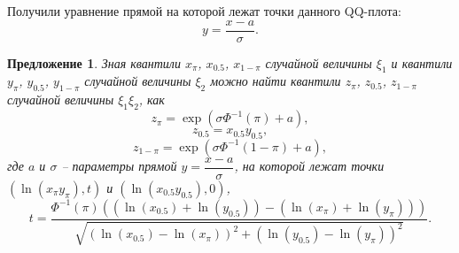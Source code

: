 \documentclass[12pt]{article}
\newtheorem{proposition}[theorem]{Предложение}
\begin{document}
	Получили уравнение прямой на которой лежат точки данного QQ-плота:
	\begin{equation}
		y = \dfrac{x-a}{\sigma}.\label{19}
	\end{equation}
	
	\begin{proposition}
		Зная квантили $x_{\pi}$, $x_{0.5}$, $x_{1-\pi}$ случайной величины $\xi_{1}$ и квантили $y_{\pi}$, $y_{0.5}$, $y_{1-\pi}$ случайной величины $\xi_{2}$ можно найти квантили $z_{\pi}$, $z_{0.5}$, $z_{1-\pi}$ случайной величины $\xi_{1}\xi_{2}$, как
		\begin{equation*}
			z_{\pi}=\exp(\sigma\Phi^{-1}(\pi)+a),
		\end{equation*}
		\begin{equation*}
			z_{0.5}=x_{0.5}y_{0.5},
		\end{equation*}
		\begin{equation*}
			z_{1-\pi}=\exp(\sigma\Phi^{-1}(1-\pi)+a),
		\end{equation*}
		где $a$ и $\sigma$ -- параметры прямой $y = \dfrac{x-a}{\sigma}$, на которой лежат точки $(\ln(x_{\pi}y_{\pi}), t)$ и $(\ln(x_{0.5}y_{0.5}),0)$,
		\begin{equation*}
			t = \frac{\Phi^{-1}(\pi)((\ln(x_{0.5})+\ln(y_{0.5}))-(\ln(x_{\pi})+\ln(y_{\pi})))}{\sqrt{(\ln(x_{0.5})-\ln(x_{\pi}))^{2}+(\ln(y_{0.5})-\ln(y_{\pi}))^{2}}}. 
		\end{equation*}
	\end{proposition}
\end{document}
